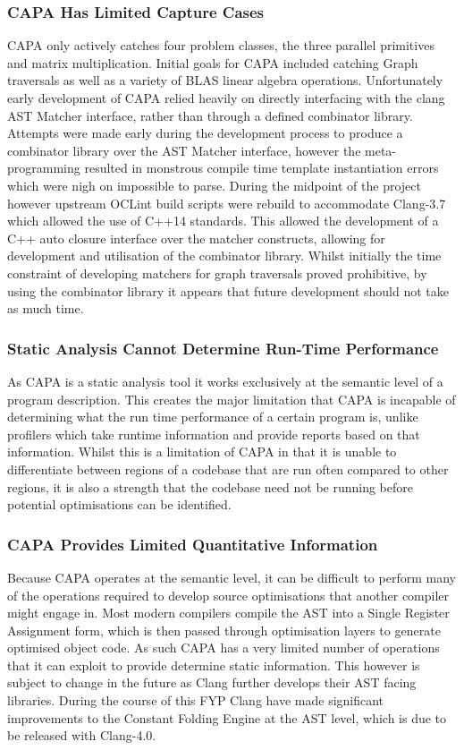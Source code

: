 \subsubsection{CAPA Has Limited Capture Cases}
CAPA only actively catches four problem classes, the three parallel primitives and matrix
multiplication. Initial goals for CAPA included catching Graph traversals as well as a variety of
BLAS linear algebra operations. Unfortunately early development of CAPA relied heavily on directly
interfacing with the clang AST Matcher interface, rather than through a defined combinator library.
Attempts were made early during the development process to produce a combinator library over the AST
Matcher interface, however the meta-programming resulted in monstrous compile time template
instantiation errors which were nigh on impossible to parse. During the midpoint of the project
however upstream OCLint build scripts were rebuild to accommodate Clang-3.7 which allowed the use of
C++14 standards. This allowed the development of a C++ auto closure interface over the matcher
constructs, allowing for development and utilisation of the combinator library. Whilst initially
the time constraint of developing matchers for graph traversals proved prohibitive, by using the
combinator library it appears that future development should not take as much time.

\subsubsection{Static Analysis Cannot Determine Run-Time Performance}
As CAPA is a static analysis tool it works exclusively at the semantic level of a program
description. This creates the major limitation that CAPA is incapable of determining what the run time
performance of a certain program is, unlike profilers which take runtime information and provide
reports based on that information. Whilst this is a limitation of CAPA in that it is unable to
differentiate between regions of a codebase that are run often compared to other regions, it is also
a strength that the codebase need not be running before potential optimisations can be identified.

\subsubsection{CAPA Provides Limited Quantitative Information}
Because CAPA operates at the semantic level, it can be difficult to perform many of the operations
required to develop source optimisations that another compiler might engage in. Most modern
compilers compile the AST into a Single Register Assignment form, which is then passed through
optimisation layers to generate optimised object code. As such CAPA has a very limited number of
operations that it can exploit to provide determine static information. This however is subject to
change in the future as Clang further develops their AST facing libraries. During the course of this
FYP Clang have made significant improvements to the Constant Folding Engine at the AST level, which
is due to be released with Clang-4.0.

